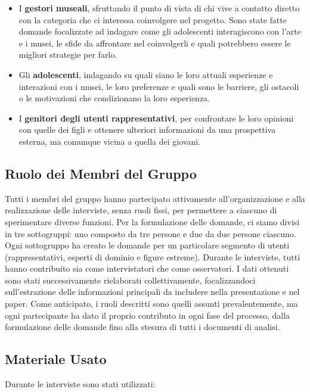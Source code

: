 \documentclass{article}
\begin{document}
\begin{itemize}
    \item I \textbf{gestori museali}, sfruttando il punto di vista di chi vive a contatto diretto con la categoria che ci interessa coinvolgere nel progetto. Sono state fatte domande focalizzate ad indagare come gli adolescenti interagiscono con l'arte e i musei, le sfide da affrontare nel coinvolgerli e quali potrebbero essere le migliori strategie per farlo.
    \item Gli \textbf{adolescenti}, indagando su quali siano le loro attuali esperienze e interazioni con i musei, le loro preferenze e quali sono le barriere, gli ostacoli o le motivazioni che condizionano la loro esperienza.
    \item I \textbf{genitori degli utenti rappresentativi}, per confrontare le loro opinioni con quelle dei figli e ottenere ulteriori informazioni da una prospettiva esterna, ma comunque vicina a quella dei giovani.
\end{itemize}

\subsection{Ruolo dei Membri del Gruppo}

Tutti i membri del gruppo hanno partecipato attivamente all’organizzazione e alla realizzazione delle interviste, senza ruoli fissi, per permettere a ciascuno di sperimentare diverse funzioni. Per la formulazione delle domande, ci siamo divisi in tre sottogruppi: uno composto da tre persone e due da due persone ciascuno. Ogni sottogruppo ha creato le domande per un particolare segmento di utenti (rappresentativi, esperti di dominio e figure estreme). Durante le interviste, tutti hanno contribuito sia come intervistatori che come osservatori. I dati ottenuti sono stati successivamente rielaborati collettivamente, focalizzandoci sull’estrazione delle informazioni principali da includere nella presentazione e nel paper. Come anticipato, i ruoli descritti sono quelli assunti prevalentemente, ma ogni partecipante ha dato il proprio contributo in ogni fase del processo, dalla formulazione delle domande fino alla stesura di tutti i documenti di analisi.

\subsection{Materiale Usato}

Durante le interviste sono stati utilizzati:
\end{document}
